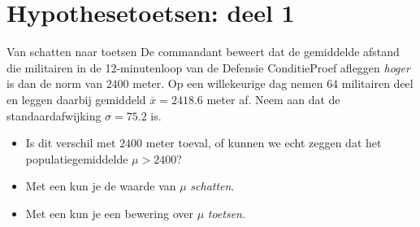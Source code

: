     \section{Hypothesetoetsen: deel 1}


    \begin{frame}{Van schatten naar toetsen}
        De commandant beweert dat de gemiddelde afstand die militairen in de 12-minutenloop van de Defensie ConditieProef afleggen \emph{hoger} is dan de norm van $2400$ meter.
        Op een willekeurige dag nemen $64$ militairen deel en leggen daarbij gemiddeld $\overline{x}=2418.6$ meter af.
        Neem aan dat de standaardafwijking $\sigma = 75.2$ is.
        \vfill
        \begin{itemize}[<+->]\setlength\itemsep{1em}
            \item Is dit verschil met $2400$ meter toeval, of kunnen we echt zeggen dat het populatiegemiddelde $\mu > 2400$?
            \item Met een  kun je de waarde van $\mu$ \emph{schatten}.
            \item Met een  kun je een bewering over $\mu$ \emph{toetsen}.
        \end{itemize}
    \end{frame}


